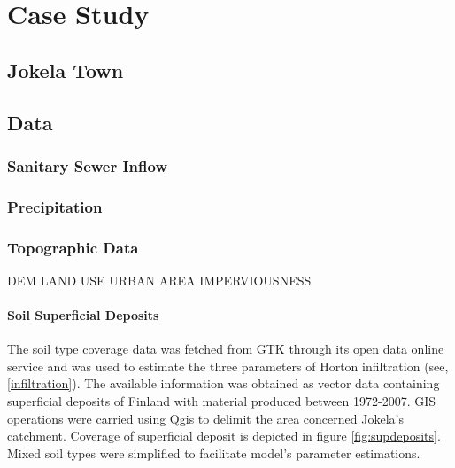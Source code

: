 
\chapter{Case Study}

\section{Jokela Town}

\section{Data}

    \subsection{Sanitary Sewer Inflow}
    
    \subsection{Precipitation}
    
    \subsection{Topographic Data}
    DEM
    LAND USE
    URBAN AREA
    IMPERVIOUSNESS
    \subsubsection{Soil Superficial Deposits}
    
    The soil type coverage data was fetched from \acf{GTK} \cite{gtkdata} through its open data online service and was used to estimate the three parameters of Horton infiltration (see, \ref{infiltration}). The available information was obtained as vector data containing superficial deposits of Finland with material produced between 1972-2007. GIS operations were carried using Qgis to delimit the area concerned Jokela's catchment. Coverage of superficial deposit is depicted in figure \ref{fig:supdeposits}. Mixed soil types were simplified to facilitate model's parameter estimations.\\
    

